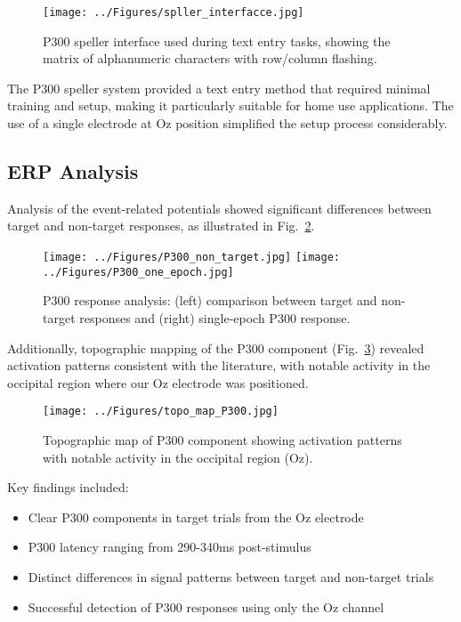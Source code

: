 \documentclass[conference]{IEEEtran}
\begin{document}
\begin{figure}[htbp]
\centerline{\texttt{[image: ../Figures/spller\_interfacce.jpg]}}
\caption{P300 speller interface used during text entry tasks, showing the matrix of alphanumeric characters with row/column flashing.}
\label{fig:speller_interface}
\end{figure}

The P300 speller system provided a text entry method that required minimal training and setup, making it particularly suitable for home use applications. The use of a single electrode at Oz position simplified the setup process considerably.

\subsection{ERP Analysis}
Analysis of the event-related potentials showed significant differences between target and non-target responses, as illustrated in Fig.~\ref{fig:p300_analysis}.

\begin{figure}[htbp]
\centerline{\texttt{[image: ../Figures/P300\_non\_target.jpg]}
\hfil
\texttt{[image: ../Figures/P300\_one\_epoch.jpg]}}
\caption{P300 response analysis: (left) comparison between target and non-target responses and (right) single-epoch P300 response.}
\label{fig:p300_analysis}
\end{figure}

Additionally, topographic mapping of the P300 component (Fig.~\ref{fig:topo_map}) revealed activation patterns consistent with the literature, with notable activity in the occipital region where our Oz electrode was positioned.

\begin{figure}[htbp]
\centerline{\texttt{[image: ../Figures/topo\_map\_P300.jpg]}}
\caption{Topographic map of P300 component showing activation patterns with notable activity in the occipital region (Oz).}
\label{fig:topo_map}
\end{figure}

Key findings included:
\begin{itemize}
\item Clear P300 components in target trials from the Oz electrode
\item P300 latency ranging from 290-340ms post-stimulus
\item Distinct differences in signal patterns between target and non-target trials
\item Successful detection of P300 responses using only the Oz channel
\end{itemize}
\end{document}
